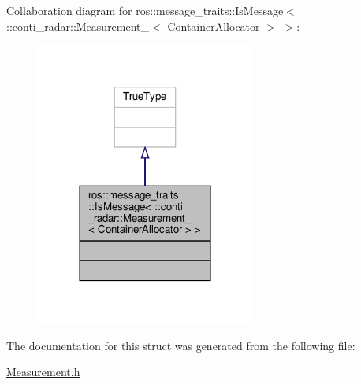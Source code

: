 Collaboration diagram for ros\+:\+:message\+\_\+traits\+:\+:Is\+Message$<$ \+:\+:conti\+\_\+radar\+:\+:Measurement\+\_\+$<$ Container\+Allocator $>$ $>$\+:\nopagebreak
\begin{figure}[H]
\begin{center}
\leavevmode
\includegraphics[width=204pt]{dc/def/structros_1_1message__traits_1_1IsMessage_3_01_1_1conti__radar_1_1Measurement___3_01ContainerAllocator_01_4_01_4__coll__graph}
\end{center}
\end{figure}


The documentation for this struct was generated from the following file\+:\begin{DoxyCompactItemize}
\item 
\hyperlink{Measurement_8h}{Measurement.\+h}\end{DoxyCompactItemize}
